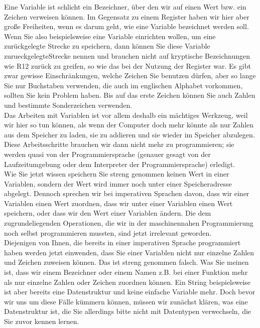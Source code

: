 Eine Variable ist schlicht ein Bezeichner, über den wir auf einen Wert bzw. ein Zeichen verweisen können. Im Gegensatz zu einem Register haben wir hier aber große Freiheiten, wenn es darum geht, wie eine Variable bezeichnet werden soll. Wenn Sie also beispielsweise eine Variable einrichten wollen, um eine zurückgelegte Strecke zu speichern, dann können Sie diese Variable zurueckgelegteStrecke nennen und brauchen nicht auf kryptische Bezeichnungen wie R12 zurück zu greifen, so wie das bei der Nutzung der Register war. Es gibt zwar gewisse Einschränkungen, welche Zeichen Sie benutzen dürfen, aber so lange Sie nur Buchstaben verwenden, die auch im englischen Alphabet vorkommen, sollten Sie kein Problem haben. Bis auf das erste Zeichen können Sie auch Zahlen und bestimmte Sonderzeichen verwenden.\\

Das Arbeiten mit Variablen ist vor allem deshalb ein mächtiges Werkzeug, weil wir hier so tun können, als wenn der Computer doch mehr könnte als nur Zahlen aus dem Speicher zu laden, sie zu addieren und sie wieder im Speicher abzulegen. Diese Arbeitsschritte brauchen wir dann nicht mehr zu programmieren; sie werden quasi von der Programmiersprache (genauer gesagt von der Laufzeitumgebung oder dem Interpreter der Programmiersprache) erledigt.\\

Wie Sie jetzt wissen speichern Sie streng genommen keinen Wert in einer Variablen, sondern der Wert wird immer noch unter einer Speicheradresse abgelegt. Dennoch sprechen wir bei imperativen Sprachen davon, dass wir einer Variablen einen Wert zuordnen, dass wir unter einer Variablen einen Wert speichern, oder dass wir den Wert einer Variablen ändern. Die dem zugrundeliegenden Operationen, die wir in der maschinennahen Programmierung noch selbst programmieren mussten, sind jetzt irrelevant geworden.\\

Diejenigen von Ihnen, die bereits in einer imperativen Sprache programmiert haben werden jetzt einwenden, dass Sie einer Variablen nicht nur einzelne Zahlen und Zeichen zuweisen können. Das ist streng genommen falsch. Was Sie meinen ist, dass wir einem Bezeichner oder einem Namen z.B. bei einer Funktion mehr als nur einzelne Zahlen oder Zeichen zuordnen können. Ein String beispielsweise ist aber bereits eine Datenstruktur und keine einfache Variable mehr. Doch bevor wir uns um diese Fälle kümmern können, müssen wir zunächst klären, was eine Datenstruktur ist, die Sie allerdings bitte nicht mit Datentypen verwechseln, die Sie zuvor kennen lernen.\\

